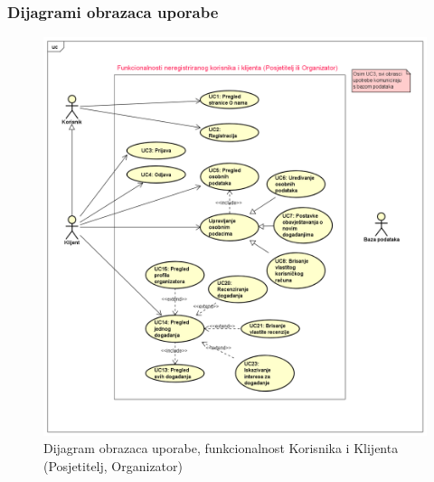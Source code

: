 	
	
	\newpage
	
	
	\subsubsection{Dijagrami obrazaca uporabe}
	
	\begin{figure}[H]
		\includegraphics[scale=0.5]{dijagrami/uc1.PNG} 
		\centering
		\caption{Dijagram obrazaca uporabe, funkcionalnost Korisnika i Klijenta (Posjetitelj, Organizator)}
		\label{fig:promjene}
	\end{figure}
	
	\newpage
	
